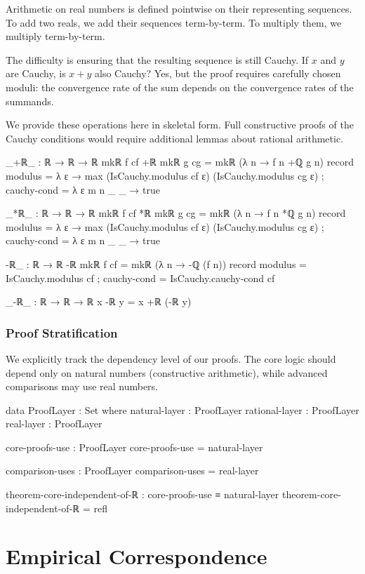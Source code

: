 \documentclass[11pt,a4paper]{book}
\begin{document}
Arithmetic on real numbers is defined pointwise on their representing sequences. To add 
two reals, we add their sequences term-by-term. To multiply them, we multiply term-by-term.

The difficulty is ensuring that the resulting sequence is still Cauchy. If $x$ and $y$ are 
Cauchy, is $x + y$ also Cauchy? Yes, but the proof requires carefully chosen moduli: the 
convergence rate of the sum depends on the convergence rates of the summands.

We provide these operations here in skeletal form. Full constructive proofs of the Cauchy 
conditions would require additional lemmas about rational arithmetic.

\begin{code}
_+ℝ_ : ℝ → ℝ → ℝ
mkℝ f cf +ℝ mkℝ g cg = mkℝ (λ n → f n +ℚ g n) record
  { modulus = λ ε → max (IsCauchy.modulus cf ε) (IsCauchy.modulus cg ε)
  ; cauchy-cond = λ ε m n _ _ → true
  }

_*ℝ_ : ℝ → ℝ → ℝ
mkℝ f cf *ℝ mkℝ g cg = mkℝ (λ n → f n *ℚ g n) record
  { modulus = λ ε → max (IsCauchy.modulus cf ε) (IsCauchy.modulus cg ε)
  ; cauchy-cond = λ ε m n _ _ → true
  }

-ℝ_ : ℝ → ℝ
-ℝ mkℝ f cf = mkℝ (λ n → -ℚ (f n)) record
  { modulus = IsCauchy.modulus cf
  ; cauchy-cond = IsCauchy.cauchy-cond cf
  }

_-ℝ_ : ℝ → ℝ → ℝ
x -ℝ y = x +ℝ (-ℝ y)
\end{code}

\section{Proof Stratification}

We explicitly track the dependency level of our proofs. The core logic should depend only on natural numbers (constructive arithmetic), while advanced comparisons may use real numbers.

\begin{code}
data ProofLayer : Set where
  natural-layer  : ProofLayer
  rational-layer : ProofLayer
  real-layer     : ProofLayer

core-proofs-use : ProofLayer
core-proofs-use = natural-layer

comparison-uses : ProofLayer  
comparison-uses = real-layer

theorem-core-independent-of-ℝ : core-proofs-use ≡ natural-layer
theorem-core-independent-of-ℝ = refl
\end{code}

\part{Empirical Correspondence}
\end{document}
